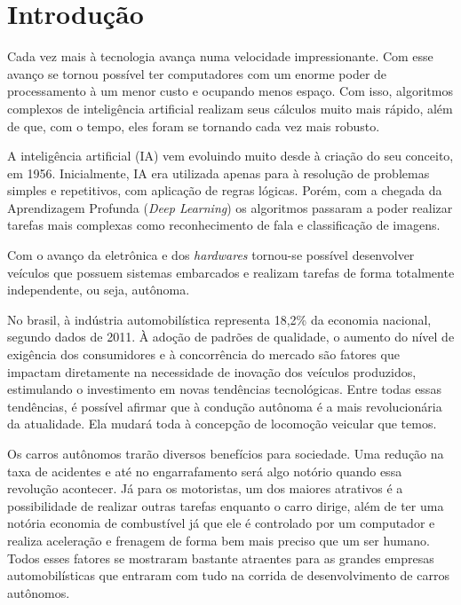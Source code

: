 \chapter{Introdução}
\label{cap:introducao}

Cada vez mais à tecnologia avança numa velocidade impressionante. Com esse avanço se tornou possível ter computadores com um enorme poder de processamento à um menor custo e ocupando menos espaço. Com isso, algoritmos complexos de inteligência artificial realizam seus cálculos muito mais rápido, além de que, com o tempo, eles foram se tornando cada vez mais robusto. \cite{rodrigues2017fundamentos} 

A inteligência artificial (IA) vem evoluindo muito desde à criação do seu conceito, em 1956. Inicialmente, IA era utilizada apenas para à resolução de problemas simples e repetitivos, com aplicação de regras lógicas. Porém, com a chegada da Aprendizagem Profunda (\textit{Deep Learning}) os algoritmos passaram a poder realizar tarefas mais complexas como reconhecimento de fala e classificação de imagens. \cite{goodfellow2016deep}

Com o avanço da eletrônica e dos \textit{hardwares} tornou-se possível desenvolver veículos que possuem sistemas embarcados e realizam tarefas de forma totalmente independente, ou seja, autônoma. \cite{rodrigues2017fundamentos}

No brasil, à indústria automobilística representa 18,2\% da economia nacional, segundo dados de 2011. À adoção de padrões de qualidade, o aumento do nível de exigência dos consumidores e à concorrência do mercado são fatores que impactam diretamente na necessidade de inovação dos veículos produzidos, estimulando o investimento em novas tendências tecnológicas. Entre todas essas tendências, é possível afirmar que à condução autônoma é a mais revolucionária da atualidade. Ela mudará toda à concepção de locomoção veicular que temos. \cite{ rodrigues2017fundamentos}

Os carros autônomos trarão diversos benefícios para sociedade. Uma redução na taxa de acidentes e até no engarrafamento será algo notório quando essa revolução acontecer. Já para os motoristas, um dos maiores atrativos é a possibilidade de realizar outras tarefas enquanto o carro dirige, além de ter uma notória economia de combustível já que ele é controlado por um computador e realiza aceleração e frenagem de forma bem mais preciso que um ser humano. Todos esses fatores se mostraram bastante atraentes para as grandes empresas automobilísticas que entraram com tudo na corrida de desenvolvimento de carros autônomos. \cite{inproceedings,rodrigues2017fundamentos}

